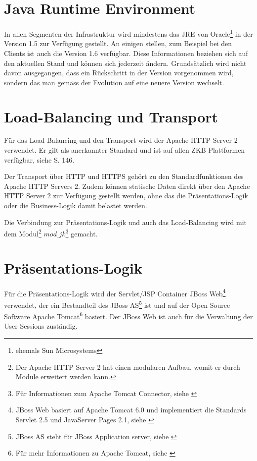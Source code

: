   \section{Java Runtime Environment}
  
  In allen Segmenten der Infrastruktur wird mindestens das \ac{JRE} von
  Oracle\footnote{ehemals Sun Microsystems} in der Version 1.5 zur Verfügung
  gestellt. An einigen stellen, zum Beispiel bei den Clients ist auch die
  Version 1.6 verfügbar. Diese Informationen beziehen sich auf den aktuellen
  Stand und können sich jederzeit ändern. Grundsätzlich wird nicht davon
  ausgegangen, dass ein Rückschritt in der Version vorgenommen wird, sondern
  das man gemäss der Evolution auf eine neuere Version wechselt.
  
  \section{Load-Balancing und Transport}
  
  Für das Load-Balancing und den Transport wird der Apache HTTP Server 2
  verwendet. Er gilt als anerkannter Standard und ist auf allen ZKB Plattformen
  verfügbar, siehe \cite{ZkbHandbuchDerItArchitektur} S. 146.
  
  Der Transport über \ac{HTTP} und \ac{HTTPS} gehört zu den Standardfunktionen
  des Apache HTTP Servers 2. Zudem können statische Daten direkt über den
  Apache HTTP Server 2 zur Verfügung gestellt werden, ohne das die
  Präsentations-Logik oder die Business-Logik damit belastet werden.
  
  Die Verbindung zur Präsentations-Logik und auch das Load-Balancing wird mit
  dem Modul\footnote{Der Apache HTTP Server 2 hat einen modularen Aufbau, womit
  er durch Module erweitert werden kann.} \(mod\_jk\)\footnote{Für
  Informationen zum Apache Tomcat Connector, siehe \cite{ModJk}} gemacht.
  
  \section{Präsentations-Logik}
  
  Für die Präsentations-Logik wird der Servlet/JSP Container JBoss
  Web\footnote{JBoss Web basiert auf Apache Tomcat 6.0 und implementiert die
  Standards Servlet 2.5 und JavaServer Pages 2.1, siehe \cite{JBossWeb}}
  verwendet, der ein Bestandteil des JBoss AS\footnote{JBoss AS steht für JBoss
  Application server, siehe \cite{JBossAS}} ist und auf der Open Source Software
  Apache Tomcat\footnote{Für mehr Informationen zu Apache Tomcat, siehe
  \cite{ApacheTomcat}} basiert. Der JBoss Web ist auch für die Verwaltung der
  User Sessions zuständig.
  

